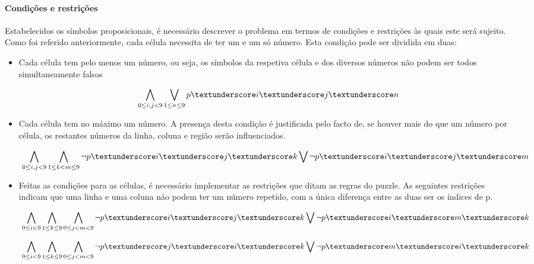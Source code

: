 \documentclass[a4paper,12pt]{article}
\begin{document}
\paragraph{Condições e restrições \newline}
Estabelecidos os símbolos proposicionais, é necessário descrever o problema em termos de condições e restrições às quais este será sujeito.
Como foi referido anteriormente, cada célula necessita de ter um e um só número. Esta condição pode ser dividida em duas:\newline
\begin{itemize}
	\item
	Cada célula tem pelo menos um número, ou seja, os símbolos da respetiva célula e dos diversos números não podem ser todos simultaneamente falsos
	
	\begin{displaymath}
	\
	\bigwedge_{0\leq i,j < 9} \bigvee_{1\leq n \leq 9} p \textunderscore i \textunderscore j \textunderscore n
	\end{displaymath}
	
	 \item Cada célula tem no máximo um número. A presença desta condição é justificada pelo facto de, se houver mais do que um número por célula, os restantes números da linha, coluna e região serão influenciados.
	
	\begin{displaymath}
	\
	\bigwedge_{0\leq i,j < 9} \bigwedge_{1\leq k < m \leq 9} \lnot p \textunderscore i \textunderscore j \textunderscore k \bigvee \lnot p \textunderscore i \textunderscore j \textunderscore m
	\end{displaymath}
	
	\item Feitas as condições para as células, é necessário implementar as restrições que ditam as regras do puzzle.
	As seguintes restrições  indicam que uma linha e uma coluna não podem ter um número repetido, com a única diferença entre as duas ser os índices de p.
	
	\begin{displaymath}
	\
	\bigwedge_{0\leq i < 9} \bigwedge_{1\leq k \leq 9} \bigwedge_{0\leq j < m < 9} \lnot p \textunderscore i \textunderscore j \textunderscore k \bigvee \lnot p \textunderscore i \textunderscore m \textunderscore k
	\end{displaymath}
	
	\begin{displaymath}
	\
	\bigwedge_{0\leq i < 9} \bigwedge_{1\leq k \leq 9} \bigwedge_{0\leq j < m < 9} \lnot p \textunderscore j \textunderscore i \textunderscore k \bigvee \lnot p \textunderscore m \textunderscore i \textunderscore k
	\end{displaymath}
	

\end{itemize}
\end{document}
